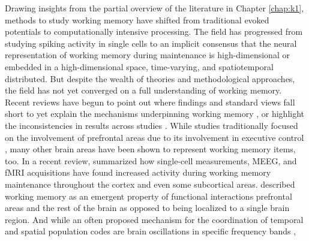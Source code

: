 Drawing insights from the partial overview of the literature in Chapter \ref{chap:k1}, methods to study working memory have shifted from traditional evoked potentials to computationally intensive processing.
The field has progressed from studying spiking activity in single cells to an implicit consensus that the neural representation of working memory during maintenance is high-dimensional or embedded in a high-dimensional space, time-varying, and spatiotemporal distributed.
But despite the wealth of theories and methodological approaches, the field has not yet converged on a full understanding of working memory.
Recent reviews have begun to point out where findings and standard views fall short to yet explain the mechanisms underpinning working memory \citep{nobre2022opening}, or highlight the inconsistencies in results across studies \citep{pavlov2022oscillatory}.
While studies traditionally focused on the involvement of prefrontal areas due to its involvement in executive control \citep[e.g.,][]{fuster1971neuron, funahashi1989mnemonic, miller1996neural}, many other brain areas have been shown to represent working memory items, too.
In a recent review, \citet{sreenivasan2019and} summarized how single-cell measurements, MEEG, and \gls{fMRI} acquisitions have found increased activity during working memory maintenance throughout the cortex and even some subcortical areas.
\citet{d2007cognitive} described working memory as an emergent property of functional interactions prefrontal areas and the rest of the brain as opposed to being localized to a single brain region.
And while an often proposed mechanism for the coordination of temporal and spatial population codes are brain oscillations in specific frequency bands \citet[e.g.,][]{roux2014working}, %

